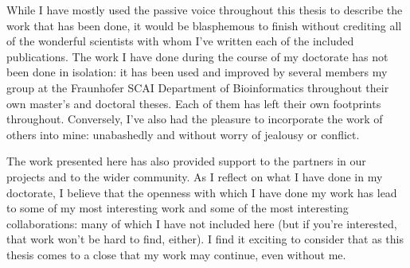 While I have mostly used the passive voice throughout this thesis to describe the work that has been done, it would be blasphemous to finish without crediting all of the wonderful scientists with whom I've written each of the included publications.
The work I have done during the course of my doctorate has not been done in isolation: it has been used and improved by several members my group at the Fraunhofer SCAI Department of Bioinformatics throughout their own master's and doctoral theses.
Each of them has left their own footprints throughout.
Conversely, I've also had the pleasure to incorporate the work of others into mine: unabashedly and without worry of jealousy or conflict.

The work presented here has also provided support to the partners in our projects and to the wider community.
As I reflect on what I have done in my doctorate, I believe that the openness with which I have done my work has lead to some of my most interesting work and some of the most interesting collaborations: many of which I have not included here (but if you're interested, that work won't be hard to find, either).
I find it exciting to consider that as this thesis comes to a close that my work may continue, even without me.
